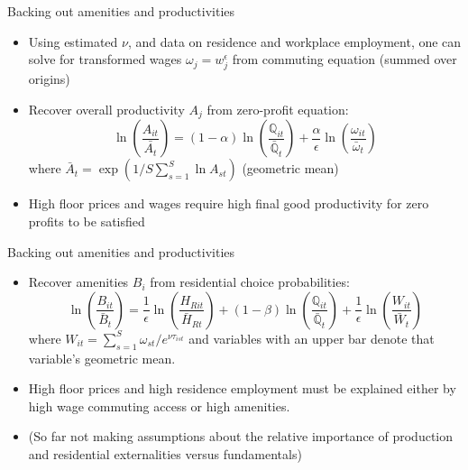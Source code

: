 \documentclass[10pt,notes=hide]{beamer}
\begin{document}
\begin{frame}{Backing out amenities and productivities}
\begin{itemize}
\item Using estimated $\nu$, and data on residence and workplace employment, one can solve for transformed wages $\omega_{j}=w_{j}^{\epsilon}$ from commuting equation (summed over origins)
\item Recover overall productivity $A_{j}$ from zero-profit equation:
\begin{equation*}
\ln\left(\frac{A_{it}}{\bar{A_{t}}} \right) = (1-\alpha) \ln \left(\frac{\mathbb{Q}_{it}}{\bar{\mathbb{Q}}_t} \right) + \frac{\alpha}{\epsilon} \ln \left(\frac{\omega_{it}}{\bar{\omega}_t} \right)
\end{equation*}
where $\bar{A}_t = \exp(1/S \sum_{s=1}^{S} \ln A_{st})$ (geometric mean)
\item High floor prices and wages require high final good productivity for zero profits to be satisfied 
\end{itemize}
\end{frame}
\begin{frame}{Backing out amenities and productivities }
\begin{itemize}
\item Recover amenities $B_{i}$ from residential choice probabilities:
\begin{equation*}
\ln\left(\frac{B_{it}}{\bar{B}_{t}} \right) = \frac{1}{\epsilon} \ln \left(\frac{H_{Rit}}{\bar{H}_{Rt}} \right) +  (1-\beta) \ln \left(\frac{\mathbb{Q}_{it}}{\bar{\mathbb{Q}}_t} \right) + \frac{1}{\epsilon} \ln \left(\frac{W_{it}}{\bar{W}_t} \right)
\end{equation*}
where $W_{it} = \sum_{s=1}^{S} \omega_{st} / e^{\nu \tau_{ist}}$  and variables with an upper bar denote that variable's geometric mean.
\item High floor prices and high residence employment must be explained either by high wage commuting access or high amenities.  
\item (So far not making assumptions about the relative importance of production and residential externalities versus fundamentals) 
\end{itemize}
\end{frame}
\end{document}
